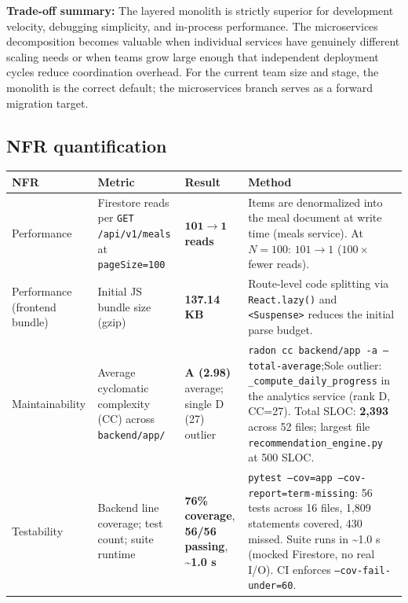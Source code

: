 \documentclass[11pt]{article}
\begin{document}
\textbf{Trade-off summary:} The layered monolith is strictly superior for development velocity,
debugging simplicity, and in-process performance. The microservices decomposition becomes
valuable when individual services have genuinely different scaling needs or when teams grow large
enough that independent deployment cycles reduce coordination overhead. For the current team
size and stage, the monolith is the correct default; the microservices branch serves as a
forward migration target.

\subsection{NFR quantification}
\label{sec:nfr-quantification}

\begin{longtable}{p{2.6cm} p{3.0cm} p{3.0cm} p{7.4cm}}
  \toprule
  \textbf{NFR} & \textbf{Metric} & \textbf{Result} & \textbf{Method} \\
  \midrule
  \endhead

  Performance
    & Firestore reads per \texttt{GET /api/v1/meals} at \texttt{pageSize=100}
    & $\mathbf{101 \to 1}$ \textbf{reads}
    & Items are denormalized into the meal document at write time
      (meals service). At $N{=}100$: $101 \to 1$ ($100\times$ fewer reads). \\

  Performance (frontend bundle)
    & Initial JS bundle size (gzip)
    & \textbf{137.14 KB}
    & Route-level code splitting via \texttt{React.lazy()} and \texttt{<Suspense>} reduces the initial parse budget. \\

  Maintainability
    & Average cyclomatic complexity (CC) across \texttt{backend/app/}
    & \textbf{A (2.98)} average; single D (27) outlier
    & \texttt{radon cc backend/app -a --total-average};Sole outlier:
      \texttt{\_compute\_daily\_progress} in the analytics service (rank D, CC=27). Total SLOC: \textbf{2,393} across 52 files; largest file \texttt{recommendation\_engine.py} at 500 SLOC. \\

  Testability
    & Backend line coverage; test count; suite runtime
    & \textbf{76\% coverage}, \textbf{56/56 passing}, \textbf{\textasciitilde{}1.0 s}
    & \texttt{pytest --cov=app --cov-report=term-missing}: 56 tests across
      16 files, 1,809 statements covered, 430 missed. Suite runs in \textasciitilde{}1.0 s
      (mocked Firestore, no real I/O). CI enforces \texttt{--cov-fail-under=60}. \\


\end{longtable}
\end{document}
